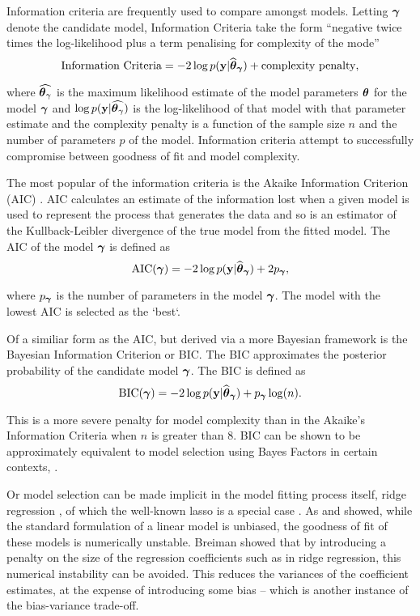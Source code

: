 
Information criteria are frequently used to compare amongst models. Letting ${\boldsymbol \gamma}$ denote the candidate model,
Information Criteria take the form ``negative twice times the log-likelihood plus a term penalising for complexity of
the mode''
$$
	\text{Information Criteria} = -2 \log p({\bf y} | \widehat{{\boldsymbol \theta}}_{\boldsymbol \gamma}) + \text{complexity penalty},
$$

\noindent where $\widehat{{\boldsymbol \theta}_\gamma}$ is the maximum likelihood estimate of the model parameters
${\boldsymbol \theta}$ for the model ${\boldsymbol \gamma}$ and $\log p({\bf y} | \widehat{{\boldsymbol \theta}_\gamma})$ is the log-likelihood of that
model with that parameter estimate and the complexity penalty is a function of the sample size $n$ and the
number of parameters $p$ of the model. Information criteria attempt to successfully compromise between
goodness of fit and model complexity.

The most popular of the information criteria is the Akaike Information Criterion (AIC) \citep{Akaike1974}. AIC
calculates an estimate of the information lost when a given model is used to represent the process that
generates the data and so is an estimator of the Kullback-Leibler divergence of the true model from the fitted
model. The AIC of the model ${\boldsymbol \gamma}$ is defined as
$$
	\text{AIC}({\boldsymbol \gamma}) = -2 \log p({\bf y} | \widehat{{\boldsymbol \theta}}_{\boldsymbol \gamma}) + 2 p_{\boldsymbol \gamma},
$$

\noindent where $p_{\boldsymbol \gamma}$ is the number of parameters in the model ${\boldsymbol \gamma}$. The model with the lowest AIC
is selected as the `best`.

Of a similiar form as the AIC, but derived via a more Bayesian framework is the Bayesian Information Criterion
or BIC. The BIC approximates the posterior probability of the candidate model ${\boldsymbol \gamma}$. The BIC is defined as
$$
	\text{BIC}({\boldsymbol \gamma}) = -2 \log p({\bf y} | \widehat{{\boldsymbol \theta}}_{\boldsymbol \gamma}) + p_{\boldsymbol \gamma} \log(n).
$$

\noindent This is a more severe penalty for model complexity than in the Akaike's Information Criteria when
$n$ is greater than $8$. BIC can be shown to be approximately equivalent to model selection using Bayes
Factors in certain contexts, \cite{Kass1993}.

Or model selection can be made implicit in the model fitting process itself,  ridge regression
\citep{Casella1980}, of which the well-known lasso is a special case \citep{Tibshirani1996}. As
\citep{Breiman1996} and \citep{Efron2013} showed, while  the standard formulation of a linear model is
unbiased, the goodness of fit of these models is numerically  unstable. Breiman showed that by introducing a
penalty on the size of the regression coefficients such as  in ridge regression, this numerical instability
can be avoided. This reduces the variances of the coefficient estimates, at the expense of introducing some
bias -- which is another instance of the bias-variance trade-off.

